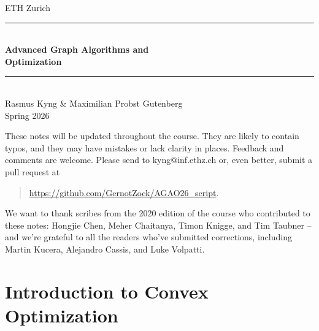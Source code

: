 \documentclass[12pt,a4paper,openany]{book}
\begin{document}
%
%
\begin{titlepage}

\newcommand{\HRule}{\rule{\linewidth}{0.5mm}} %
{\center

{\Large ETH Zurich}\\[1.5cm]
\HRule \\[0.4cm]
{ \huge \bfseries Advanced Graph Algorithms and \\ Optimization}\\[0.4cm] %
\HRule \\[1.5cm]

{\LARGE Rasmus Kyng \& Maximilian Probst Gutenberg}\\[2cm]


{\Large Spring 2026}\\[2cm] %

}
\vfill




\end{titlepage}

These notes will be updated throughout the course.
They are likely to contain typos, and they may have mistakes or
lack clarity in places. Feedback and comments are 
welcome. Please send to kyng@inf.ethz.ch or, even better, submit a pull request at
\begin{quote}
  \url{https://github.com/GernotZock/AGAO26_script}.
\end{quote}


We want to thank scribes from the 2020 edition of the course who
contributed to these notes: Hongjie
Chen, Meher Chaitanya, Timon Knigge, and Tim Taubner -- and we're
grateful to all the readers who've submitted corrections, including
Martin Kucera, Alejandro Cassis, and Luke Volpatti.

\newpage

\tableofcontents

\label{part:intro}


\part{Introduction to Convex Optimization}
\label{part:convex}


\end{document}
